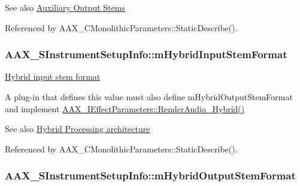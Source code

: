 \begin{DoxySeeAlso}{See also}
\hyperlink{a00339}{Auxiliary Output Stems} 
\end{DoxySeeAlso}


Referenced by A\+A\+X\+\_\+\+C\+Monolithic\+Parameters\+::\+Static\+Describe().

\hypertarget{a00124_aeeee9ec016294caab1317d170ee0a2c2}{}
\subsubsection[{m\+Hybrid\+Input\+Stem\+Format}]{ A\+A\+X\+\_\+\+S\+Instrument\+Setup\+Info\+::m\+Hybrid\+Input\+Stem\+Format}\label{a00124_aeeee9ec016294caab1317d170ee0a2c2}


\hyperlink{a00335_ga6571f4e41a5dd06e4067249228e2249ea33a950bc2e02d38fc3be0a0ad8cc89b1}{Hybrid input stem format} 

A plug-\/in that defines this value must also define {\ttfamily m\+Hybrid\+Output\+Stem\+Format} and implement \hyperlink{a00335_gae6139041de22f51f3146d26a01c54c1b}{A\+A\+X\+\_\+\+I\+Effect\+Parameters\+::\+Render\+Audio\+\_\+\+Hybrid()} \begin{DoxySeeAlso}{See also}
\hyperlink{a00335}{Hybrid Processing architecture} 
\end{DoxySeeAlso}


Referenced by A\+A\+X\+\_\+\+C\+Monolithic\+Parameters\+::\+Static\+Describe().

\hypertarget{a00124_a1cc911c56d96a35affcc8fea94a983ae}{}
\subsubsection[{m\+Hybrid\+Output\+Stem\+Format}]{ A\+A\+X\+\_\+\+S\+Instrument\+Setup\+Info\+::m\+Hybrid\+Output\+Stem\+Format}\label{a00124_a1cc911c56d96a35affcc8fea94a983ae}


